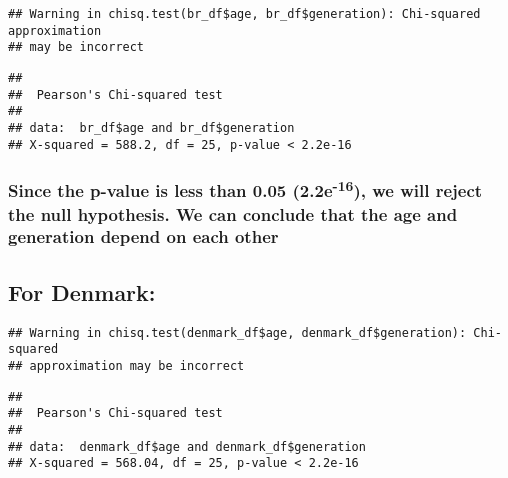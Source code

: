 \documentclass[
]{article}
\newenvironment{Shaded}{\begin{snugshade}}{\end{snugshade}}
\newcommand{\FunctionTok}[1]{\textcolor[rgb]{0.00,0.00,0.00}{#1}}
\newcommand{\NormalTok}[1]{#1}
\newcommand{\SpecialCharTok}[1]{\textcolor[rgb]{0.00,0.00,0.00}{#1}}
\begin{document}
\begin{verbatim}
## Warning in chisq.test(br_df$age, br_df$generation): Chi-squared approximation
## may be incorrect
\end{verbatim}

\begin{verbatim}
## 
##  Pearson's Chi-squared test
## 
## data:  br_df$age and br_df$generation
## X-squared = 588.2, df = 25, p-value < 2.2e-16
\end{verbatim}

\hypertarget{since-the-p-value-is-less-than-0.05-2.2e-16-we-will-reject-the-null-hypothesis.-we-can-conclude-that-the-age-and-generation-depend-on-each-other-1}{%
\subsubsection{\texorpdfstring{Since the p-value is less than 0.05
(2.2e\textsuperscript{-16}), we will reject the null hypothesis. We can
conclude that the age and generation depend on each
other}{Since the p-value is less than 0.05 (2.2e-16), we will reject the null hypothesis. We can conclude that the age and generation depend on each other}}\label{since-the-p-value-is-less-than-0.05-2.2e-16-we-will-reject-the-null-hypothesis.-we-can-conclude-that-the-age-and-generation-depend-on-each-other-1}}

\hypertarget{for-denmark-1}{%
\subsection{For Denmark:}\label{for-denmark-1}}

\begin{Shaded}
\end{Shaded}

\begin{verbatim}
## Warning in chisq.test(denmark_df$age, denmark_df$generation): Chi-squared
## approximation may be incorrect
\end{verbatim}

\begin{verbatim}
## 
##  Pearson's Chi-squared test
## 
## data:  denmark_df$age and denmark_df$generation
## X-squared = 568.04, df = 25, p-value < 2.2e-16
\end{verbatim}
\end{document}

